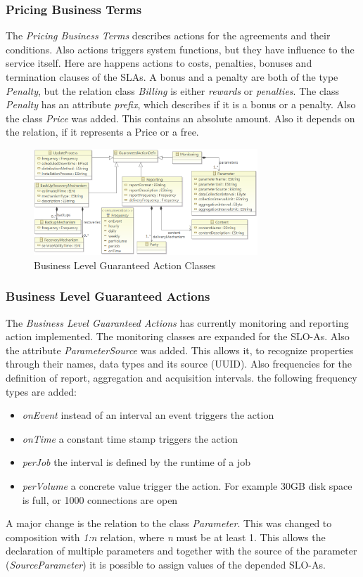 \subsubsection{Pricing Business Terms}
The {\it Pricing Business Terms} describes actions for the agreements and their conditions. Also actions triggers system functions, but they have influence to the service itself. Here are happens actions to costs, penalties, bonuses and termination clauses of the SLAs. A bonus and a penalty are both of the type {\it Penalty}, but the relation class {\it Billing} is either {\it rewards} or {\it penalties}. The class {\it Penalty} has an attribute {\it prefix}, which describes if it is a bonus or a penalty. Also the class {\it Price} was added. This contains an absolute amount. Also it depends on the relation, if it represents a Price or a free.
\begin{figure}[ht]
\begin{center}
\includegraphics[width=0.75\textwidth]{fig/sloa_func_actions.png}
\end{center}
\caption{Business Level Guaranteed Action Classes}
\label{fig:business_level_garanteed}
\end{figure}

\subsubsection{Business Level Guaranteed Actions}
The {\it Business Level Guaranteed Actions} has currently monitoring and reporting action implemented. The monitoring classes are expanded for the SLO-As. Also the attribute {\it ParameterSource} was added. This allows it, to recognize properties through their names, data types and its source (UUID). Also frequencies for the definition of report, aggregation and acquisition intervals. the following frequency types are added:
\begin{itemize}
\item {\it onEvent} instead of an interval an event triggers the action
\item {\it onTime} a constant time stamp triggers the action
\item {\it perJob} the interval is defined by the runtime of a job
\item {\it perVolume} a concrete value trigger the action. For example 30GB disk space is full, or 1000 connections are open 
\end{itemize}
A major change is the relation to the class {\it Parameter}. This was changed to composition with {\it 1:n} relation, where {\it n} must be at least 1. This allows the declaration of multiple parameters and together with the source of the parameter ({\it SourceParameter}) it is possible to assign values of the  depended SLO-As.  


